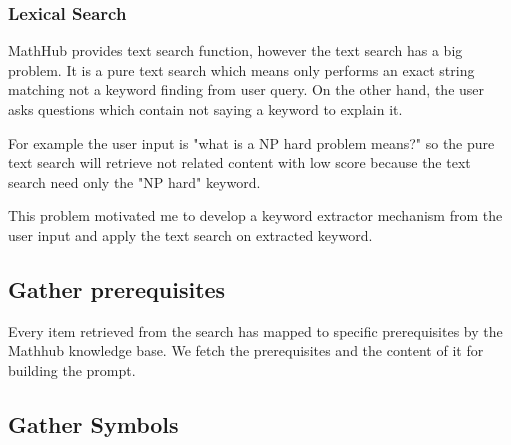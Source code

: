 \subsubsection{Lexical Search}
MathHub provides text search function, however the text search has a big problem. It is a pure text search
which means only performs an exact string matching not a keyword finding from user query.
On the other hand, the user asks questions which contain not saying a keyword to explain it.

For example the user input is  "what is a NP hard problem means?" so the pure text search will retrieve not
related content with low score because the text search need only the "NP hard" keyword.

This problem motivated me to develop a keyword extractor mechanism from the user input and apply the text search
on extracted keyword.

\subsection{Gather prerequisites}

Every item retrieved from the search has mapped to specific prerequisites by the Mathhub knowledge base. We fetch the 
prerequisites and the content of it for building the prompt.

\subsection{Gather Symbols}